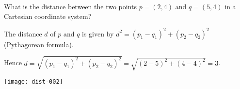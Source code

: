 
\begin{question}
What is the distance between the two points
$p = (2, 4)$ and $q = (5, 4)$
in a Cartesian coordinate system?
\end{question}

\begin{solution}
The distance $d$ of $p$ and $q$ is given by
$d^2 = (p_1 - q_1)^2 + (p_2 - q_2)^2$ (Pythagorean formula).

Hence $d = \sqrt{(p_1 - q_1)^2 + (p_2 - q_2)^2} =
  \sqrt{(2 - 5)^2 + (4 - 4)^2}
   = 3$.

\texttt{[image: dist-002]}
\end{solution}

